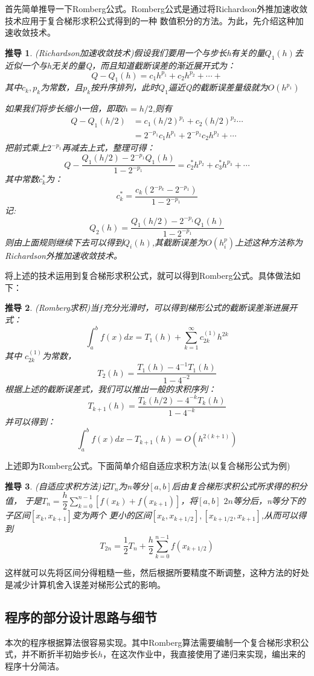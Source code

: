 \documentclass{ctexart}
\newtheorem{define}{\hspace{2em}推导}
\begin{document}
首先简单推导一下Romberg公式。Romberg公式是通过将Richardson外推加速收敛技术应用于复合梯形求积公式得到的一种
数值积分的方法。为此，先介绍这种加速收敛技术。
\begin{define}
(Richardson加速收敛技术)假设我们要用一个与步长h有关的量$Q_1(h)$去近似一个与h无关的量Q，而且知道截断误差的渐近展开式为：
\[Q-Q_1(h)=c_1h^{p_1}+c_2h^{p_2}+\cdots+\]
其中$c_k,p_k$为常数，且$p_k$按升序排列，此时$Q_1$逼近Q的截断误差量级就为$O(h^{p_1})$

如果我们将步长缩小一倍，即取$h=h/2$,则有
\begin{equation*}
\begin{split}
Q-Q_1(h/2) &=c_1(h/2)^{p_1}+c_2(h/2)^{p_2}\cdots \\
 &=2^{-p_1}c_1h^{p_1}+2^{-p_2}c_2h^{p_2}+\cdots
\end{split}
\end{equation*}
把前式乘上$2^{-p_1}$再减去上式，整理可得：
\[Q-\dfrac{Q_1(h/2)-2^{-p_1}Q_1(h)}{1-2^{-p_1}}=c_2^*h^{p_2}+c_3^{*}h^{p_3}+\cdots \]
其中常数$c_k^{*}$为：
\[c_k^{*}=\dfrac{c_k(2^{-p_k}-2^{-p_1})}{1-2^{-p_1}}\]
记:
\[Q_2(h)=\dfrac{Q_1(h/2)-2^{-p_1}Q_1(h)}{1-2^{-p_1}}\]
则由上面规则继续下去可以得到$Q_{i}(h)$,其截断误差为$O(h^p_i)$上述这种方法称为Richardson外推加速收敛技术。
\end{define}
将上述的技术运用到复合梯形求积公式，就可以得到Romberg公式。具体做法如下：
\begin{define}
(Romberg求积)当$f$充分光滑时，可以得到梯形公式的截断误差渐进展开式：
\[\int_{a}^{b}f(x)dx=T_1(h)+\sum_{k=1}^{\infty}c_{2k}^{(1)}h^{2k}\]
其中 $c_{2k}^{(1)}$为常数，
\[T_2(h)=\dfrac{T_1(h)-4^{-1}T_1(h)}{1-4^{-2}}\]
根据上述的截断误差式，我们可以推出一般的求积序列：
\[T_{k+1}(h)=\dfrac{T_k(h/2)-4^{-k}T_k(h)}{1-4^{-k}}\]
并可以得到：
\[\int_a^bf(x)dx-T_{k+1}(h)=O(h^{2(k+1)})\]
\end{define}
上述即为Romberg公式。下面简单介绍自适应求积方法(以复合梯形公式为例)
\begin{define}
(自适应求积方法)记$T_n$为n等分$[a,b]$后由复合梯形求积公式所求得的积分值，
于是$T_n=\dfrac{h}{2}\sum\limits_{k=0}^{n-1}[f(x_k)+f(x_{k+1})]$，将$[a,b]$ $2n$等分后，n等分下的子区间$[x_k,x_{k+1}]$变为两个
更小的区间$[x_k,x_{k+1/2}],[x_{k+1/2},x_{k+1}]$,从而可以得到
\[
T_{2n}=\dfrac{1}{2}T_n+\dfrac{h}{2}\sum_{k=0}^{n-1}f(x
_{k+1/2})
\]
\end{define}
这样就可以先将区间分得粗糙一些，然后根据所要精度不断调整，这种方法的好处是减少计算机舍入误差对梯形公式的影响。

\subsection{程序的部分设计思路与细节}
本次的程序根据算法很容易实现。其中Romberg算法需要编制一个复合梯形求积公式，并不断折半初始步长$h$，在这次作业中，我直接使用了递归来实现，编出来的程序十分简洁。
\end{document}
